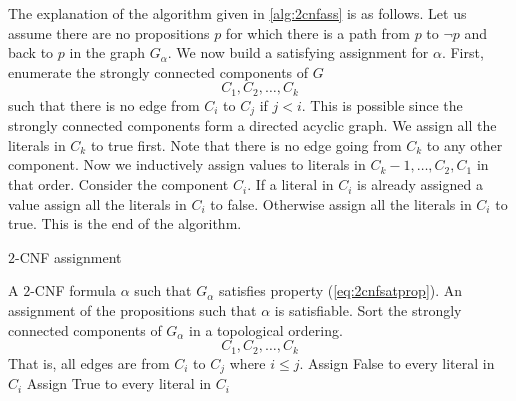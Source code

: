 The explanation of the algorithm given in \ref{alg:2cnfass} is as follows. Let us assume there are no propositions $p$ for which there is a path from $p$ to $\neg p$ and back to $p$ in the graph $G_{\alpha}$. We now build a satisfying assignment for $\alpha$. First, enumerate the strongly connected components of $G$
\[
C_1, C_2, \dots, C_k
\]
such that there is no edge from $C_i$ to $C_j$ if $j<i$. This is possible since the strongly connected components form a directed acyclic graph.  We assign all the literals in $C_k$ to true first. Note that there is no edge going from $C_k$ to any other component. Now we inductively assign values to literals in $C_k-1,\dots,C_2,C_1$ in that order. Consider the component $C_i$. If a literal in $C_i$ is already assigned a value assign all the literals in $C_i$ to false. Otherwise assign all the literals in $C_i$ to true. This is the end of the algorithm. 

\begin{algorithm}[H]
 \caption{$2$-CNF assignment}
 \label{alg:2cnfass}
 \begin{algorithmic}[1]
 \renewcommand{\algorithmicrequire}{\textbf{Input:}}
 \renewcommand{\algorithmicensure}{\textbf{Output:}}
 \REQUIRE A $2$-CNF formula $\alpha$ such that $G_{\alpha}$ satisfies property (\ref{eq:2cnfsatprop}).
 \ENSURE  An assignment of the propositions such that $\alpha$ is satisfiable.
  \STATE Sort the strongly connected components of $G_{\alpha}$ in a topological ordering.  
  \[
  		C_1, C_2, \dots, C_k
  \]
  That is, all edges are from $C_i$ to $C_j$ where $i \leq j$.
  			\STATE Assign False to every literal in $C_i$
  		\ELSE
  			\STATE Assign True to every literal in $C_i$
  		\ENDIF
  \ENDFOR
 \end{algorithmic} 
 \end{algorithm}

